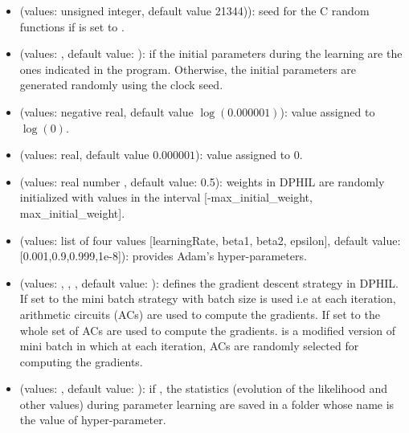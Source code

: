 \documentclass[letterpaper,10pt,english]{sphinxmanual}
\begin{document}
\begin{itemize}
\begin{itemize}
\item {} 
 (values: unsigned integer, default value 21344)): seed for the C random functions if  is set to .

\item {} 
 (values: , default value: ): if  the initial parameters during the learning are the ones indicated in the program. Otherwise, the initial parameters are generated randomly using the clock seed.

\item {} 
 (values: negative real, default value \(\log(0.000001)\)): value assigned to \(\log(0)\).

\item {} 
 (values: real, default value \(0.000001\)): value assigned to \(0\).

\item {} 
 (values: real number , default value: 0.5): weights in DPHIL are randomly initialized with values in the interval {[}-max\_initial\_weight, max\_initial\_weight{]}.

\item {} 
 (values: list of four values {[}learningRate, beta1, beta2, epsilon{]}, default value: {[}0.001,0.9,0.999,1e-8{]}): provides Adam’s hyper-parameters.

\item {} 
 (values: , , , default value: ): defines the gradient descent strategy in DPHIL. If set to  the mini batch strategy with batch size  is used i.e at each iteration,  arithmetic circuits (ACs) are used to compute the gradients. If set to  the whole set of ACs are used to compute the gradients.  is a modified version of mini batch in which at each iteration,   ACs are randomly selected for computing the gradients.

\item {} 
 (values: , default value: ): if , the statistics (evolution of the likelihood and other values) during parameter learning are saved in a folder whose name is the value of  hyper-parameter.


\end{itemize}
\end{itemize}
\end{document}
